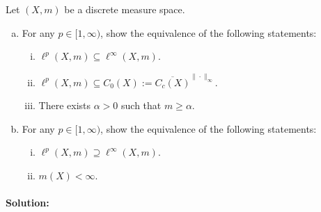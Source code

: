 Let $(X,m)$ be a discrete measure space.
\begin{enumerate}[(a)]
	\item 
		For any $p\in [1,\infty)$, show the equivalence of the following statements:
		\begin{enumerate}[(i)]
			\item 
				$\ell^{p}(X,m)\subseteq\ell^{\infty}(X,m)$.
			\item 
				$\ell^{p}(X,m)\subseteq C_{0}(X):=\overline{C_{c}(X)}^{\|\cdot\|_{\infty}}$.
			\item 
				There exists $\alpha>0$ such that $m\geq\alpha$.
		\end{enumerate}
	\item 
		For any $p\in [1, \infty)$, show the equivalence of the following statements:
		\begin{enumerate}[(i)]
			\item 
				$\ell^{p}(X,m)\supseteq\ell^{\infty}(X,m)$.
			\item 
				$m(X)<\infty$.
		\end{enumerate}
\end{enumerate}

\paragraph{Solution:}

